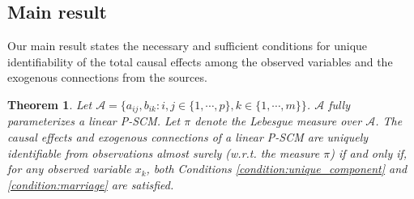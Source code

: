 \documentclass[12pt]{article}
\newtheorem{theorem}{Theorem}
\begin{document}
\subsection{Main result} \label{sec:main_result}
\vspace{-2mm}
Our main result states the necessary and sufficient conditions for unique identifiability of the total causal effects among the observed variables and the exogenous connections from the sources.
\vspace{-1mm}
\begin{theorem} \label{thm:main}
Let $\mathcal{A}=\{a_{ij},b_{ik}: i,j\in\{1,\cdots,p\}, k\in\{1,\cdots,m\}\}$. $\mathcal{A}$ fully parameterizes a linear P-SCM. Let $\pi$ denote the Lebesgue measure over $\mathcal{A}$. The causal effects and exogenous connections of a linear P-SCM are uniquely identifiable from observations {\it{almost surely}} (w.r.t. the measure $\pi$) if and only if, for any observed variable $x_k$, both Conditions \ref{condition:unique_component} and \ref{condition:marriage} are satisfied. 


\end{theorem}
\end{document}
